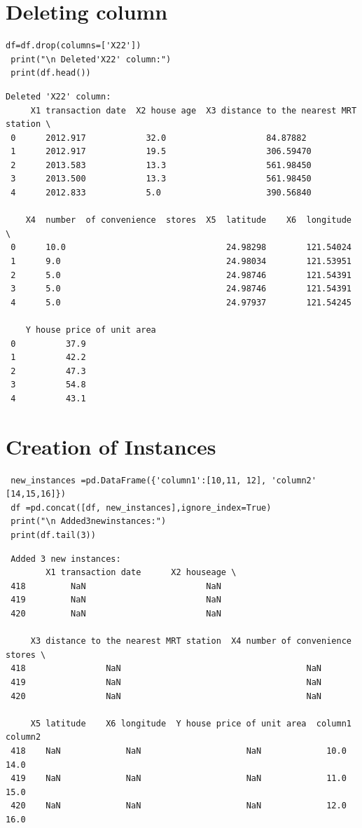 \section{Deleting column}
\begin{lstlisting}
df=df.drop(columns=['X22'])
 print("\n Deleted'X22' column:")
 print(df.head())
\end{lstlisting}
\newpage
\begin{verbatim}
Deleted 'X22' column:
     X1 transaction date  X2 house age  X3 distance to the nearest MRT station \
 0      2012.917            32.0                    84.87882
 1      2012.917            19.5                    306.59470
 2      2013.583            13.3                    561.98450
 3      2013.500            13.3                    561.98450
 4      2012.833            5.0                     390.56840
 
    X4  number  of convenience  stores  X5  latitude    X6  longitude \
 0      10.0                                24.98298        121.54024
 1      9.0                                 24.98034        121.53951
 2      5.0                                 24.98746        121.54391
 3      5.0                                 24.98746        121.54391
 4      5.0                                 24.97937        121.54245
 
    Y house price of unit area          
 0          37.9                       
 1          42.2                        
 2          47.3                       
 3          54.8                        
 4          43.1                       

\end{verbatim}
\section{Creation of Instances}
\begin{lstlisting}
 new_instances =pd.DataFrame({'column1':[10,11, 12], 'column2' [14,15,16]})
 df =pd.concat([df, new_instances],ignore_index=True)
 print("\n Added3newinstances:")
 print(df.tail(3))
\end{lstlisting}
\begin{verbatim}
 Added 3 new instances:
        X1 transaction date      X2 houseage \
 418         NaN                        NaN
 419         NaN                        NaN
 420         NaN                        NaN
 
     X3 distance to the nearest MRT station  X4 number of convenience stores \
 418                NaN                                     NaN
 419                NaN                                     NaN
 420                NaN                                     NaN
 
     X5 latitude    X6 longitude  Y house price of unit area  column1     column2
 418    NaN             NaN                     NaN             10.0          14.0
 419    NaN             NaN                     NaN             11.0          15.0
 420    NaN             NaN                     NaN             12.0          16.0                     

\end{verbatim}
